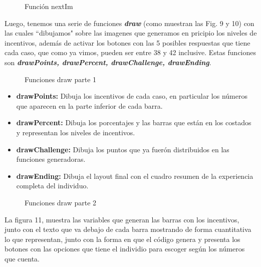 \documentclass[11pt,letterpaper]{article}
\begin{document}
\begin{figure}
 \centering
 \caption{Función nextIm}
\end{figure}


Luego, tenemos una serie de funciones \textbf{\textit{draw}} (como muestran las Fig. 9 y 10) con las cuales ``dibujamos" sobre las imagenes que generamos en pricipio los niveles de incentivos, además de activar los botones con las 5 posibles respuestas que tiene cada caso, que como ya vimos, pueden ser entre 38 y 42 inclusive. Estas funciones son \textbf{\textit{drawPoints, drawPercent, drawChallenge, drawEnding}}.

\begin{figure}
 \centering
 \caption{Funciones draw parte 1}
\end{figure}



\begin{itemize}
    \item \textbf{drawPoints:} Dibuja los incentivos de cada caso, en particular los números que aparecen en la parte inferior de cada barra.
    \item \textbf{drawPercent:} Dibuja los porcentajes y las barras que están en los costados y representan los niveles de incentivos. 
    \item \textbf{drawChallenge:} Dibuja los puntos que ya fuerón distribuidos en las funciones generadoras.
    \item \textbf{drawEnding:} Dibuja el layout final con el cuadro resumen de la experiencia completa del individuo.
\end{itemize}

\begin{figure}
 \centering
 \caption{Funciones draw parte 2}
\end{figure}


La figura 11, muestra las variables que generan las barras con los incentivos, junto con el texto que va debajo de cada barra mostrando de forma cuantitativa lo que representan, junto con la forma en que el código genera y presenta los botones con las opciones que tiene el individio para escoger según los números que cuenta.
\end{document}
